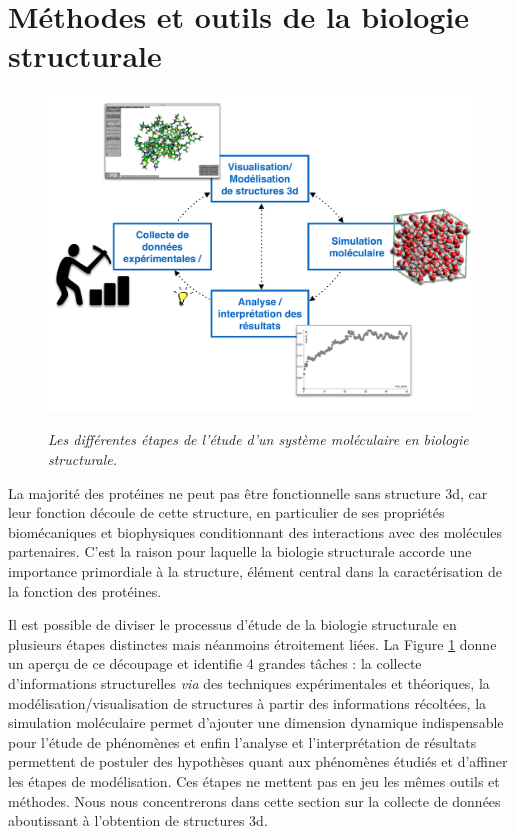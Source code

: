 \section{Méthodes et outils de la biologie structurale}

\begin{figure}[h]
  \centering
  {\includegraphics[width=.75\linewidth]{./figures/ch1/structural_biology_process}}
    \caption{{\it Les différentes étapes de l'étude d'un système moléculaire en biologie structurale.}}
  \label{Fig:schema_seq_bio_struct}
  \hspace{0.2cm}
\end{figure}

La majorité des protéines ne peut pas être fonctionnelle sans structure 3d, car leur fonction découle de cette structure, en particulier de ses propriétés biomécaniques et biophysiques conditionnant des interactions avec des molécules partenaires. C'est la raison pour laquelle la biologie structurale accorde une importance primordiale à la structure, élément central dans la caractérisation de la fonction des protéines.

Il est possible de diviser le processus d'étude de la biologie structurale en plusieurs étapes distinctes mais néanmoins étroitement liées. La Figure \ref{Fig:schema_seq_bio_struct} donne un aperçu de ce découpage et identifie 4 grandes tâches : la collecte d'informations structurelles \textit{via} des techniques expérimentales et théoriques, la modélisation/visualisation de structures à partir des informations récoltées, la simulation moléculaire permet d'ajouter une dimension dynamique indispensable pour l'étude de phénomènes et enfin l'analyse et l'interprétation de résultats permettent de postuler des hypothèses quant aux phénomènes étudiés et d'affiner les étapes de modélisation.
Ces étapes ne mettent pas en jeu les mêmes outils et méthodes. Nous nous concentrerons dans cette section sur la collecte de données aboutissant à l'obtention de structures 3d.

